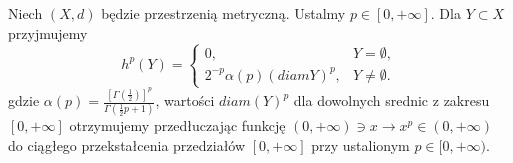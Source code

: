 \begin{defi}
	Niech $(X, d)$ będzie przestrzenią metryczną. Ustalmy $p \in [0, +\infty]$. Dla $Y \subset X$ przyjmujemy 
	$$
		h^p(Y) = 
		\begin{cases}
			0, & Y = \emptyset, \\
			2^{-p}\alpha(p)(diam Y)^p, & Y \neq \emptyset.
		\end{cases}
	$$ gdzie $\alpha(p) = \frac{[\Gamma(\frac{1}{2})]^p}{\Gamma(\frac{1}{2}p + 1)}$, wartości $diam(Y)^p$ dla dowolnych srednic z zakresu $[0, +\infty]$ otrzymujemy przedłuczając funkcję $(0, +\infty) \ni x \rightarrow x^p \in (0, +\infty)$ do ciągłego przekstałcenia przedziałów $[0, +\infty]$ przy ustalionym $p \in [0, +\infty)$.
\end{defi}
